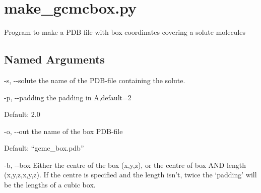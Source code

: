 \documentclass[letterpaper,10pt,english]{sphinxmanual}
\begin{document}
\section{make\_gcmcbox.py}
\label{\detokenize{tools:make-gcmcbox-py}}

Program to make a PDB-file with box coordinates covering a solute molecules


%
\begin{sphinxVerbatim}[commandchars=\\\{\}]
  \PYG{p}{[}\PYG{p}{]} \PYG{p}{[} \PYG{p}{]} \PYG{p}{[} \PYG{p}{]} \PYG{p}{[} \PYG{p}{]}
                       \PYG{p}{[}  \PYG{p}{[} \PYG{p}{]}\PYG{p}{]}
\end{sphinxVerbatim}


\subsection{Named Arguments}
\label{\detokenize{tools:Named Arguments}}\begin{optionlist}{3cm}
\item [-s, -{-}solute]  
the name of the PDB-file containing the solute.
\item [-p, -{-}padding]  
the padding in A,default=2

Default: 2.0
\item [-o, -{-}out]  
the name of the box PDB-file

Default: “gcmc\_box.pdb”
\item [-b, -{-}box]  
Either the centre of the box (x,y,z), or the centre of box AND length (x,y,z,x,y,z). If the centre is specified and the length isn’t, twice the ‘padding’ will be the lengths of a cubic box.
\end{optionlist}


%
\begin{sphinxVerbatim}[commandchars=\\\{\}]
  
    
    
\end{sphinxVerbatim}
\end{document}
